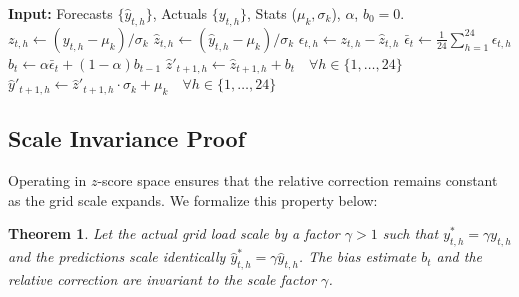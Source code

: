 \documentclass[10pt,twocolumn,letterpaper]{article}
\newtheorem{theorem}{Theorem}
\begin{document}
\begin{algorithm}[h]
\caption{TIDE Algorithm}\label{alg:tide}
\begin{algorithmic}[1]
\State \textbf{Input:} Forecasts $\{\hat{y}_{t,h}\}$, Actuals $\{y_{t,h}\}$, Stats ($\mu_k, \sigma_k$), $\alpha$, $b_0 = 0$.
        \State $z_{t,h} \gets (y_{t,h} - \mu_k) / \sigma_k$
        \State $\hat{z}_{t,h} \gets (\hat{y}_{t,h} - \mu_k) / \sigma_k$
        \State $\epsilon_{t,h} \gets z_{t,h} - \hat{z}_{t,h}$
    \EndFor
    \State $\bar{\epsilon}_t \gets \frac{1}{24} \sum_{h=1}^{24} \epsilon_{t,h}$
    \State $b_t \gets \alpha \bar{\epsilon}_t + (1 - \alpha) b_{t-1}$
    \State $\hat{z}'_{t+1,h} \gets \hat{z}_{t+1,h} + b_t \quad \forall h \in \{1, \dots, 24\}$
    \State $\hat{y}'_{t+1,h} \gets \hat{z}'_{t+1,h} \cdot \sigma_k + \mu_k \quad \forall h \in \{1, \dots, 24\}$
\EndFor
\end{algorithmic}
\end{algorithm}

\subsection{Scale Invariance Proof}
Operating in $z$-score space ensures that the relative correction remains constant as the grid scale expands. We formalize this property below:

\begin{theorem}
Let the actual grid load scale by a factor $\gamma > 1$ such that $y^*_{t,h} = \gamma y_{t,h}$ and the predictions scale identically $\hat{y}^*_{t,h} = \gamma \hat{y}_{t,h}$. The bias estimate $b_t$ and the relative correction are invariant to the scale factor $\gamma$.
\end{theorem}
\end{document}
